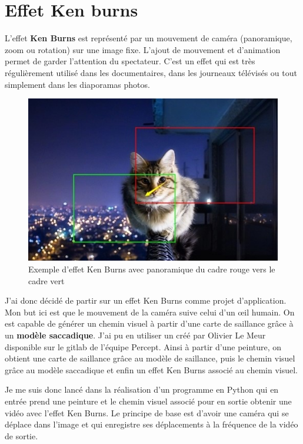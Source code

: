 \newpage
\section{Effet Ken burns}

\par
L'effet \textbf{Ken Burns} est représenté par un mouvement de caméra (panoramique, zoom ou rotation) sur une image fixe. L'ajout de mouvement et d'animation permet de garder l'attention du spectateur. C'est un effet qui est très régulièrement utilisé dans les documentaires, dans les journeaux télévisés ou tout simplement dans les diaporamas photos. 

\begin{figure}[ht]
    \centering
    \includegraphics[width=0.7\linewidth]{datas/kenburnseffect.jpg}
    \caption{Exemple d'effet Ken Burns avec panoramique du cadre rouge vers le cadre vert}
    \label{kenburnsexemple}
\end{figure}

\par
J'ai donc décidé de partir sur un effet Ken Burns comme projet d'application. Mon but ici est que le mouvement de la caméra suive celui d'un \oe{}il humain. On est capable de générer un chemin visuel à partir d'une carte de saillance grâce à un \textbf{modèle saccadique}. J'ai pu en utiliser un créé par Olivier Le Meur \cite{saccadicmodel} disponible sur le gitlab de l'équipe Percept. Ainsi à partir d'une peinture, on obtient une carte de saillance grâce au modèle de saillance, puis le chemin visuel grâce au modèle saccadique et enfin un effet Ken Burns associé au chemin visuel.

\par
Je me suis donc lancé dans la réalisation d'un programme en Python qui en entrée prend une peinture et le chemin visuel associé pour en sortie obtenir une vidéo avec l'effet Ken Burns. Le principe de base est d'avoir une caméra qui se déplace dans l'image et qui enregistre ses déplacements à la fréquence de la vidéo de sortie.

